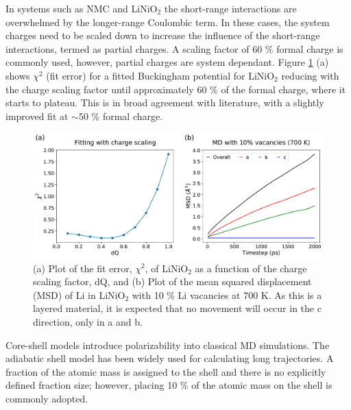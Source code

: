 \documentclass[journal=jacsat,manuscript=article]{achemso}
\begin{document}
In systems such as NMC and LiNiO$_2$ the short-range interactions are overwhelmed by the longer-range Coulombic term. 
In these cases, the system charges need to be scaled down to increase the influence of the short-range interactions, termed as partial charges. 
A scaling factor of 60 \% formal charge is commonly used, \cite{pedone2006potentials} however, partial charges are system dependant. 
Figure \ref{fig:LiNiO2_fitting} (a) shows $\chi^2$ (fit error) for a fitted Buckingham potential for LiNiO$_2$ reducing with the charge scaling factor until approximately 60 \% of the formal charge, where it starts to plateau.
This is in broad agreement with literature, with a slightly improved fit at $\sim$50 \% formal charge.

\begin{figure}[h]
    \centering
    \includegraphics[scale=0.5]{Figures/LiNiO2_plots.pdf}
    \caption{\label{fig:LiNiO2_fitting} (a) Plot of the fit error, $\chi^2$, of LiNiO$_2$ as a function of the charge scaling factor, dQ, and (b) Plot of the mean squared displacement (MSD) of Li in LiNiO$_2$ with 10 \% Li vacancies at 700 K. As this is a layered material, it is expected that no movement will occur in the c direction, only in a and b.}
\end{figure}

Core-shell models introduce polarizability into classical MD simulations. The adiabatic shell model \cite{Mitchell_1993} has been widely used for calculating long trajectories. 
A fraction of the atomic mass is assigned to the shell and there is no explicitly defined fraction size; however, placing 10 \% of the atomic mass on the shell is commonly adopted. \cite{PLIMPTON19951,todorov2006dl_poly_3}
\end{document}
